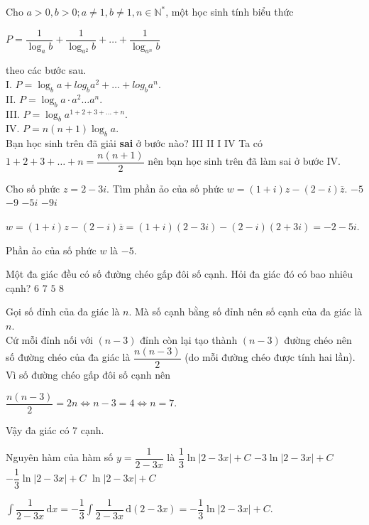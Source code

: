 \begin{ex}%
	Cho $a>0,b>0;a\ne 1,b\ne 1,n\in \mathbb{N^*}$, một học sinh tính biểu thức 
	\begin{center}
		$P=\dfrac{1}{\log_ab}+\dfrac{1}{\log_{a^2}b}+\ldots +\dfrac{1}{\log_{a^n}b}$
	\end{center}
	theo các bước sau.\\
	I. $P=\log_ba+log_ba^2+\ldots+log_ba^n$.\\
	II. $P=\log_ba\cdot a^2\ldots a^n$.\\
	III. $P=\log_ba^{1+2+3+\ldots+n}$.\\
	IV. $P=n(n+1)\log_ba$.\\
	Bạn học sinh trên đã giải \textbf{sai} ở bước nào?
	\choice
	{III}
	{II}
	{I}
	{\True IV}
	\loigiai
	{
		Ta có $1+2+3+\ldots+n=\dfrac{n(n+1)}{2}$ nên bạn học sinh trên đã làm sai ở bước IV.
	}
\end{ex} 

\begin{ex}%
	Cho số phức $z=2-3i$. Tìm phần ảo của số phức $w=(1+i)z-(2-i)\overline{z}$.
	\choice
	{\True $-5$}
	{$-9$}
	{$-5i$}
	{$-9i$}
	\loigiai
	{
		\begin{center}
					$w=(1+i)z-(2-i)\overline{z}=(1+i)(2-3i)-(2-i)(2+3i)=-2-5i$.
		\end{center}
		Phần ảo của số phức $w$ là $-5$.
	}
\end{ex} 

\begin{ex}%
	Một đa giác đều có số đường chéo gấp đôi số cạnh. Hỏi đa giác đó có bao nhiêu cạnh?
	\choice
	{$6$}
	{\True $7$}
	{$5$}
	{$8$}
	\loigiai
	{
		Gọi số đỉnh của đa giác là $n$. Mà số cạnh bằng số đỉnh nên số cạnh của đa giác là $n$.\\
		Cứ mỗi đỉnh nối với $(n-3)$ đỉnh còn lại tạo thành $(n-3)$ đường chéo nên số đường chéo của đa giác là $\dfrac{n(n-3)}{2}$ (do mỗi đường chéo được tính hai lần).
		Vì số đường chéo gấp đôi số cạnh nên 
		\begin{center}
			$\dfrac{n(n-3)}{2}=2n\Leftrightarrow n-3=4\Leftrightarrow
			n=7.$
		\end{center}
		Vậy đa giác có $7$ cạnh.
	}
\end{ex} 

\begin{ex}%
	Nguyên hàm của hàm số $y=\dfrac{1}{2-3x}$ là
	\choice
	{$\dfrac{1}{3}\ln |2-3x|+C$}
	{$-3\ln |2-3x|+C$}
	{\True $-\dfrac{1}{3}\ln |2-3x|+C$}
	{$\ln|2-3x|+C$}
	\loigiai
	{
		\begin{center}
			$\displaystyle\int \dfrac{1}{2-3x}\mathrm{\,d}x=-\dfrac{1}{3}\displaystyle\int \dfrac{1}{2-3x}\mathrm{\,d}(2-3x)=-\dfrac{1}{3}\ln |2-3x|+C$.
		\end{center}
	}
\end{ex} 


